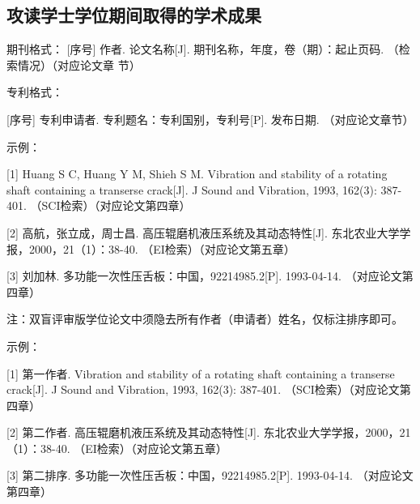 \subsection{攻读学士学位期间取得的学术成果}

期刊格式：
[序号] 作者. 论文名称[J]. 期刊名称，年度，卷（期）：起止页码. （检索情况）（对应论文章
节）

专利格式：

[序号] 专利申请者. 专利题名：专利国别，专利号[P]. 发布日期. （对应论文章节）

示例：

[1] Huang S C, Huang Y M, Shieh S M. Vibration and stability of a rotating shaft containing a transerse crack[J]. J Sound and Vibration, 1993, 162(3): 387-401. （SCI检索）（对应论文第四章）

[2] 高航，张立成，周士昌. 高压辊磨机液压系统及其动态特性[J]. 东北农业大学学报，2000，21（1）：38-40. （EI检索）（对应论文第五章）

[3] 刘加林. 多功能一次性压舌板：中国，92214985.2[P]. 1993-04-14. （对应论文第四章）


注：双盲评审版学位论文中须隐去所有作者（申请者）姓名，仅标注排序即可。

示例：

[1] 第一作者. Vibration and stability of a rotating shaft containing a transerse crack[J]. J Sound and Vibration, 1993, 162(3): 387-401. （SCI检索）（对应论文第四章）

[2] 第二作者. 高压辊磨机液压系统及其动态特性[J]. 东北农业大学学报，2000，21（1）：38-40. （EI检索）（对应论文第五章）

[3] 第二排序. 多功能一次性压舌板：中国，92214985.2[P]. 1993-04-14. （对应论文第四章）



